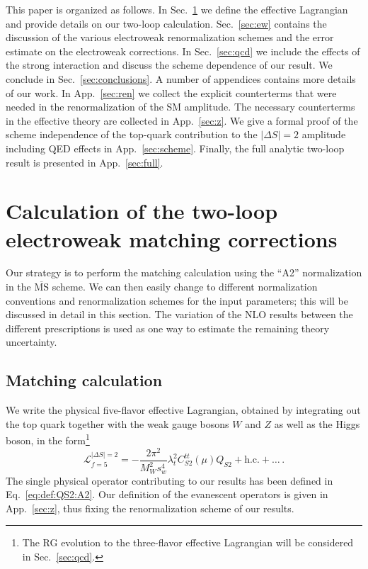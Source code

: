 \documentclass[letter,11pt,DIV=12,abstract=true,numbers=noenddot,titlepage=false,twocolumn=false,draft=false]{scrartcl}
\newcommand{\MS}{$\overline{\text{MS}}$}
\begin{document}
This paper is organized as follows. In Sec.~\ref{sec:match:ew} we
define the effective Lagrangian and provide details on our two-loop
calculation. Sec.~\ref{sec:ew} contains the discussion of the various
electroweak renormalization schemes and the error estimate on the
electroweak corrections. In Sec.~\ref{sec:qcd} we include the effects
of the strong interaction and discuss the scheme dependence of our
result. We conclude in Sec.~\ref{sec:conclusions}. A number of
appendices contains more details of our work. In App.~\ref{sec:ren} we
collect the explicit counterterms that were needed in the
renormalization of the SM amplitude. The necessary counterterms in the
effective theory are collected in App.~\ref{sec:z}. We give a formal
proof of the scheme independence of the top-quark contribution to the
$|\Delta S| = 2$ amplitude including QED effects in
App.~\ref{sec:scheme}. Finally, the full analytic two-loop result is
presented in App.~\ref{sec:full}.




\section{Calculation of the two-loop electroweak matching corrections}\label{sec:match:ew}

Our strategy is to perform the matching calculation using the ``A2''
normalization in the \MS{} scheme. We can then easily change to
different normalization conventions and renormalization schemes for
the input parameters; this will be discussed in detail in this
section. The variation of the NLO results between the different
prescriptions is used as one way to estimate the remaining theory
uncertainty.


\subsection{Matching calculation}

We write the physical five-flavor effective Lagrangian, obtained by
integrating out the top quark together with the weak gauge bosons $W$
and $Z$ as well as the Higgs boson, in the form\footnote{The RG
  evolution to the three-flavor effective Lagrangian will be
  considered in Sec.~\ref{sec:qcd}.}
\begin{equation}\label{eq:LS2:A2}
\mathcal{L}^{|\Delta S|=2}_{f=5} = - \frac{2\pi^2}{M_W^2 s_w^4} \lambda_t^2
C_{S2}^{tt} (\mu)
Q_{S2} + \textrm{h.c.} + \dots \,.
\end{equation}
The single physical operator contributing to our results has been
defined in Eq.~\eqref{eq:def:QS2:A2}. Our definition of the evanescent
operators is given in App.~\ref{sec:z}, thus fixing the
renormalization scheme of our results.
\end{document}

